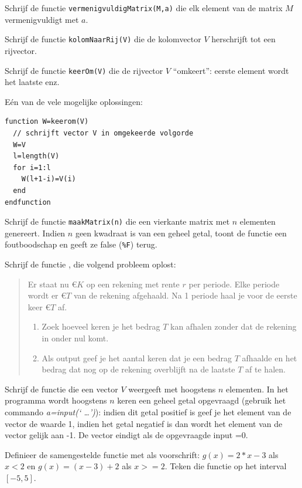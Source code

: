 \begin{oef}
Schrijf de functie \texttt{vermenigvuldigMatrix(M,a)} die elk element van de matrix $M$ vermenigvuldigt met $a$.
\end{oef}
\begin{oef}
Schrijf de functie \texttt{kolomNaarRij(V)} die de kolomvector $V$ herschrijft tot een rijvector.
\end{oef}
\begin{oef}
Schrijf de functie \texttt{keerOm(V)} die de rijvector $V$ ``omkeert'': eerste element wordt het laatste enz.
\begin{opl}Eén van de vele mogelijke oplossingen:
\begin{lstlisting}[caption={Een vector omkeren}, label=vectoromkeren]
function W=keerom(V)
  // schrijft vector V in omgekeerde volgorde
  W=V
  l=length(V)
  for i=1:l
    W(l+1-i)=V(i)
  end
endfunction
\end{lstlisting}
\end{opl}
\end{oef}
\begin{oef}
Schrijf de functie \texttt{maakMatrix(n)} die een vierkante matrix met $n$ e\-le\-menten genereert. Indien $n$ geen kwadraat is van een geheel getal, toont de functie een foutboodschap en geeft ze {\sc false} (\texttt{\%F}) terug.
\end{oef}
   
\begin{oef}
   Schrijf de functie , die volgend probleem oplost:
   \begin{quote}
     Er staat nu \euro $K$  op een rekening met  rente $r$  per periode.
Elke periode wordt er \euro ${T}$ van de  rekening afgehaald. 
Na 1 periode haal je voor de eerste keer \euro ${T}$ af.
\begin{enumerate}
    \item  Zoek hoeveel keren 
je het bedrag $T$ kan afhalen zonder dat de rekening in onder nul komt.


    \item Als output geef je het aantal keren dat je een bedrag 
    $T$ afhaalde en het bedrag dat nog op de rekening overblijft na 
    de laatste $T$ af te halen.
\end{enumerate}  
   \end{quote}
   \end{oef}

\begin{oef}
Schrijf de functie  die een vector $V$ 
weergeeft met hoogstens $n$ elementen. In het programma wordt hoogstens $n$ keren 
een geheel getal opgevraagd (gebruik het commando \emph{a=input(`  \ldots')}):
indien dit getal positief is geef je  het element van de vector de waarde 1, 
indien het getal negatief is dan wordt het element van de vector gelijk aan -1.
De vector eindigt als de opgevraagde input =0.
\end{oef}
\begin{oef}
Definieer de samengestelde functie  met
    als voorschrift:
$g(x)=2*x-3$ als $x<2$ en $g(x)=(x-3)+2$ als $x>=2$. 
Teken die functie op het
interval $[-5,5]$.
\end{oef}

